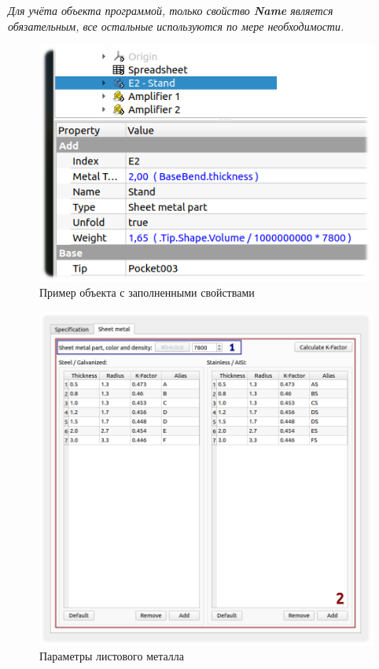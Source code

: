 \documentclass[a4paper,12pt]{article}
\begin{document}
\begin{center}\emph{Для учёта объекта программой, только свойство \textbf{Name} является обязательным, все остальные используются по мере необходимости.}\end{center}

\begin{figure}[htp]
\centering
\includegraphics[scale=0.8]{img/properties.png}
\caption{Пример объекта с заполненными свойствами}
\label{sec:properties}
\end{figure}

\pagebreak

\begin{figure}[htp]
\centering
\includegraphics[width=1.0\textwidth]{img/pref_sm.png}
\caption{Параметры листового металла}
\label{sec:pref_sm}
\end{figure}
\end{document}
